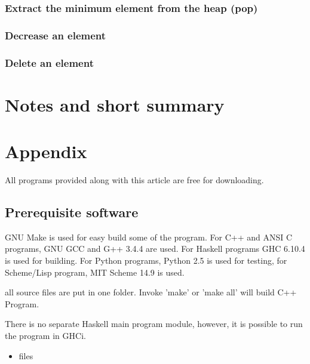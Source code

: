 \documentclass{article}
\begin{document}
\subsubsection{Extract the minimum element from the heap (pop)}

\subsubsection{Decrease an element}

\subsubsection{Delete an element}

\section{Notes and short summary}

\section{Appendix} \label{appendix}
All programs provided along with this article are free for
downloading.

\subsection{Prerequisite software}
GNU Make is used for easy build some of the program. For C++ and ANSI C programs,
GNU GCC and G++ 3.4.4 are used. 
For Haskell programs GHC 6.10.4 is used
for building. For Python programs, Python 2.5 is used for testing, for
Scheme/Lisp program, MIT Scheme 14.9 is used.

all source files are put in one folder. Invoke 'make' or 'make all'
will build C++ Program. 

There is no separate Haskell main program module, however, it is possible to run the program in GHCi.

\begin{itemize}
\item files

\end{itemize}
\end{document}
